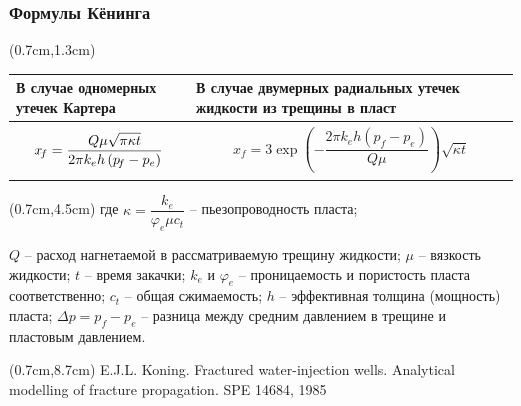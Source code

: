\documentclass{beamer}
\begin{document}
\begin{frame}
\frametitle{Формулы Кёнинга}
\small
\begin{textblock*}{11cm}(0.7cm,1.3cm)
\begin{tabular}{|p{4.3cm}|p{5.9cm}|}
\hline
В случае одномерных утечек Картера & В случае двумерных радиальных утечек жидкости из трещины в пласт\\
\hline
$$x_{\!f}=\frac{Q\mu\sqrt{\pi\kappa t}}{2\pi k_eh\left(p_{\!f}-p_e\right)}
\vspace*{-3mm}$$ & $$x_{\!f}=3\exp{\!\left(-\frac{2\pi k_e h\left(p_{\!f}-p_e\right)}{Q\mu}\right)}\sqrt{\kappa t}$$ \\
\hline
\end{tabular}
\end{textblock*}

\begin{textblock*}{11cm}(0.7cm,4.5cm)
где
$\kappa=\dfrac{k_e}{\varphi_e\mu c_t}$ -- пьезопроводность пласта;\newline

$Q$ -- расход нагнетаемой в рассматриваемую трещину жидкости;\newline
$\mu$ -- вязкость жидкости;
$t$ -- время закачки;\newline
$k_e$ и $\varphi_e$ -- проницаемость и пористость пласта соответственно;\newline
$c_t$ -- общая сжимаемость;
$h$ -- эффективная толщина (мощность) пласта;
$\Delta p=p_{\!f}-p_e$ -- разница между средним давлением в трещине и пластовым давлением.
\end{textblock*}
\normalsize

\begin{textblock*}{10cm}(0.7cm,8.7cm)
\tiny
\textcolor{lit_gray}{E.J.L. Koning. Fractured water-injection wells. Analytical modelling of fracture propagation. SPE 14684, 1985}
\end{textblock*}

\normalsize


\end{frame}
\end{document}

